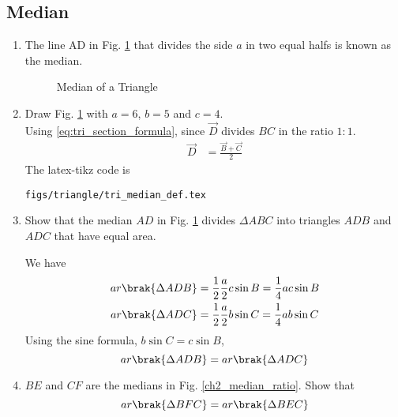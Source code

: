 %
\subsection{Median}
\renewcommand{\theequation}{\theenumi}
\begin{enumerate}[label=\arabic*.,ref=\thesubsection.\theenumi]

\item	The line AD in Fig. \ref{fig:tri_median_def} that divides the side $a$ in two equal halfs is known as the median.

\begin{figure}[!ht]
	\begin{center}
		
		\resizebox{\columnwidth}{!}{}

	\end{center}
	\caption{Median of a Triangle}
	\label{fig:tri_median_def}	
\end{figure}
%
\item Draw Fig. \ref{fig:tri_median_def} with $a=6$, $b=5$  and $c=4$.  
\label{const:tri_median_def}
%
\\
\solution Using \eqref{eq:tri_section_formula}, since $\vec{D}$ divides $BC$ in the ratio $1:1$.
\begin{align}
\vec{D} &= \frac{\vec{B} + \vec{C}}{2}  
\end{align}
%
%
The  latex-tikz code is
%
\begin{lstlisting}
figs/triangle/tri_median_def.tex
\end{lstlisting}
\item
	Show that the median $AD$ in Fig. \ref{fig:tri_median_def} divides  $\Delta ABC$ into triangles $ADB$ and $ADC$ that have equal area.

\solution We have
%
\begin{align}
ar \brak{\Delta ADB} &= \frac{1}{2}\frac{a}{2}c \sin B =  \frac{1}{4}ac \sin B \\
ar \brak{\Delta ADC} &= \frac{1}{2}\frac{a}{2}b \sin C =  \frac{1}{4}ab \sin C 
\end{align}
%
Using the sine formula, $b \sin C = c \sin B$,
\begin{equation}
ar \brak{\Delta ADB} = ar \brak{\Delta ADC}
\end{equation}
\item
	$BE$ and $CF$ are the medians in Fig. \ref{ch2_median_ratio}.  Show that
	\begin{equation}
	ar \brak{\Delta BFC} = ar \brak{\Delta BEC}
	\end{equation} 
	\label{ch2_median_eq_tri}


\end{enumerate}
